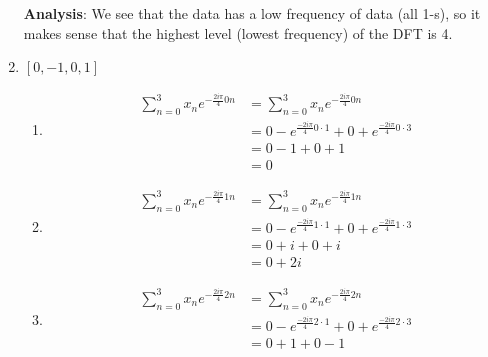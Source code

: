 \documentclass{article}
\begin{document}
\begin{enumerate}[label=\Alph*)]
            \textbf{Analysis}: We see that the data has a low frequency of data (all 1-s), so it makes sense that the highest level (lowest frequency) of the DFT is 4.
      \item \([0, -1, 0, 1]\)
            \begin{enumerate}[label={k=\arabic*}, start=0]
                  \item \begin{align*}
                              \sum_{n=0}^{3}{x_n e^{-\frac{2 i \pi}{4}0n}} & = \sum_{n=0}^{3}{x_n e^{-\frac{2 i \pi}{4}0n}}                                \\
                                                                           & = 0 - e^{\frac{-2 i \pi}{4} 0 \cdot 1} + 0 + e^{\frac{-2 i \pi}{4} 0 \cdot 3} \\
                                                                           & = 0 - 1 + 0 + 1                                                               \\
                                                                           & = 0
                        \end{align*}
                  \item \begin{align*}
                              \sum_{n=0}^{3}{x_n e^{-\frac{2 i \pi}{4}1n}} & = \sum_{n=0}^{3}{x_n e^{-\frac{2 i \pi}{4}1n}}                                \\
                                                                           & = 0 - e^{\frac{-2 i \pi}{4} 1 \cdot 1} + 0 + e^{\frac{-2 i \pi}{4} 1 \cdot 3} \\
                                                                           & = 0 + i + 0 + i                                                               \\
                                                                           & = 0 + 2i
                        \end{align*}
                  \item \begin{align*}
                              \sum_{n=0}^{3}{x_n e^{-\frac{2 i \pi}{4}2n}} & = \sum_{n=0}^{3}{x_n e^{-\frac{2 i \pi}{4}2n}}                                \\
                                                                           & = 0 - e^{\frac{-2 i \pi}{4} 2 \cdot 1} + 0 + e^{\frac{-2 i \pi}{4} 2 \cdot 3} \\
                                                                           & = 0 + 1 + 0 - 1                                                               \\

\end{align*}
\end{enumerate}
\end{enumerate}
\end{document}
